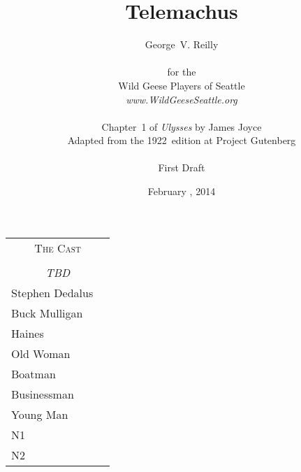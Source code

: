 



\title{\Huge Telemachus}
\author{George~V. Reilly\\
\\
{\small for the}\\
Wild Geese Players of Seattle\\
{\emph{www.WildGeeseSeattle.org}}\\
\\
{\small Chapter~1 of \emph{Ulysses} by James Joyce}\\
{\small Adapted from the 1922~edition at Project Gutenberg}
\\
\\
{\small First Draft}}
\date{February , 2014}
\raggedbottom



\maketitle
\thispagestyle{empty}
\pagebreak

\begin{tabular}{lp{10cm}}
    \multicolumn{2}{c}{\Large \textsc{The Cast}} \\
\\
    \multicolumn{2}{c}{\large \textit{TBD}} \\
Stephen Dedalus \\
Buck Mulligan \\
Haines \\
Old Woman \\
Boatman \\
Businessman \\
Young Man \\
N1 \\
N2 \\
\end{tabular}

\thispagestyle{empty}
\newpage


\setcounter{page}{1}








